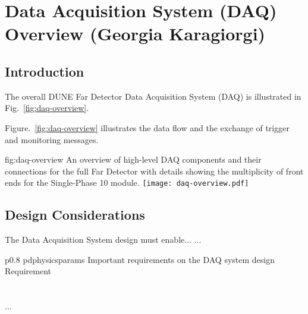 \section{Data Acquisition System (DAQ) Overview (Georgia Karagiorgi)}
\label{sec:fdsp-daq-ov}


\subsection{Introduction}
\label{sec:fdsp-daq-intro}

The overall DUNE Far Detector Data Acquisition System (DAQ) is
illustrated in Fig.~\ref{fig:daq-overview}.

Figure.~\ref{fig:daq-overview} illustrates the data flow and the
exchange of trigger and monitoring messages.



\begin{dunefigure}{fig:daq-overview}
  {An overview of high-level DAQ components and their connections for the full Far Detector with details showing the multiplicity of front ends for the Single-Phase \SI{10}{\kton} module.}
\texttt{[image: daq-overview.pdf]}%
\end{dunefigure}



\subsection{Design Considerations}
\label{sec:fdsp-daq-des-consid}




The Data Acquisition System design must enable... 
...


\begin{dunetable}
{p{0.8\textwidth}}
{pdphysicsparams}
{Important requirements on the DAQ system design}   
Requirement  \\ \toprowrule
  \\ \colhline
   \\ \colhline
 ...\\ 
\end{dunetable}

